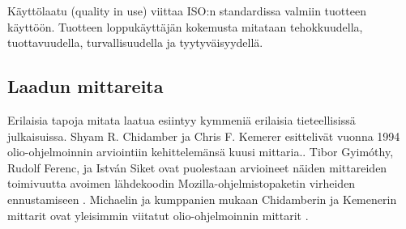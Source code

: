 \documentclass[finnish]{tktltiki2}
\theoremstyle{definition}
\theoremstyle{remark}
\begin{document}
Käyttölaatu (quality in use) viittaa ISO:n standardissa valmiin tuotteen käyttöön. Tuotteen loppukäyttäjän kokemusta mitataan tehokkuudella, tuottavuudella, turvallisuudella ja tyytyväisyydellä.






\subsection{Laadun mittareita}

Erilaisia tapoja mitata laatua esiintyy kymmeniä erilaisia tieteellisissä julkaisuissa. Shyam R. Chidamber ja Chris F. Kemerer \cite{Chidamber94} esittelivät vuonna 1994 olio-ohjelmoinnin arviointiin kehittelemänsä kuusi mittaria.. Tibor Gyimóthy, Rudolf Ferenc, ja István Siket ovat puolestaan arvioineet näiden mittareiden toimivuutta avoimen lähdekoodin Mozilla-ohjelmistopaketin virheiden ennustamiseen \cite{Gyimothy05}. Michaelin ja kumppanien mukaan Chidamberin ja Kemenerin mittarit ovat yleisimmin viitatut olio-ohjelmoinnin mittarit \cite{Michael02}.

\end{document}
